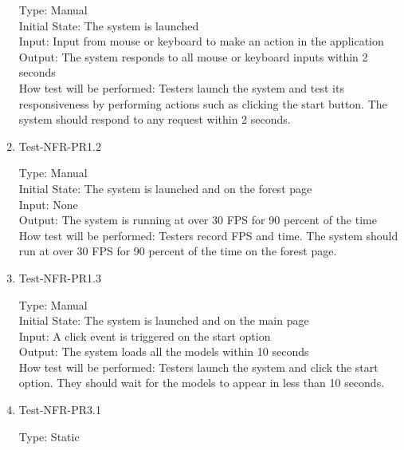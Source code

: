 \documentclass[12pt, titlepage]{article}
\begin{document}
\begin{enumerate}
Type: Manual\\

Initial State: The system is launched\\

Input: Input from mouse or keyboard to make an action in the application\\

Output: The system responds to all mouse or keyboard inputs within 2 seconds\\

How test will be performed: Testers launch the system and test its responsiveness by performing actions such as clicking the start button. The system should respond to any request within 2 seconds.

\item{Test-NFR-PR1.2\\}

Type: Manual\\

Initial State: The system is launched and on the forest page\\

Input: None\\

Output: The system is running at over 30 FPS for 90 percent of the time\\

How test will be performed: Testers record FPS and time. The system should run at over 30 FPS for 90 percent of the time on the forest page.

\item{Test-NFR-PR1.3\\}

Type: Manual\\

Initial State: The system is launched and on the main page\\

Input: A click event is triggered on the start option\\

Output: The system loads all the models within 10 seconds\\

How test will be performed: Testers launch the system and click the start option. They should wait for the models to appear in less than 10 seconds.

\item{Test-NFR-PR3.1\\}

Type: Static\\


\end{enumerate}
\end{document}
